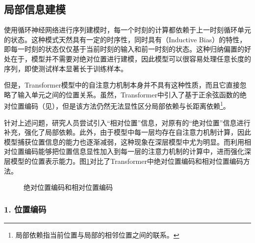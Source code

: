 
\subsection{局部信息建模}\label{subsec-15.1.1}

\parinterval 使用循环神经网络进行序列建模时，每一个时刻的计算都依赖于上一时刻循环单元的状态。这种模式天然具有一定的时序性，同时具有{\small{}}（Inductive Bias）的特性，即每一时刻的状态仅仅基于当前时刻的输入和前一时刻的状态。这种归纳偏置的好处在于，模型并不需要对绝对位置进行建模，因此模型可以很容易处理任意长度的序列，即使测试样本显著长于训练样本。

\parinterval 但是，Transformer模型中的自注意力机制本身并不具有这种性质，而且它直接忽略了输入单元之间的位置关系。虽然，Transformer中引入了基于正余弦函数的绝对位置编码（见{\chaptertwelve}），但是该方法仍然无法显性区分局部依赖与长距离依赖\footnote[1]{局部依赖指当前位置与局部的相邻位置之间的联系。}。

\parinterval 针对上述问题，研究人员尝试引入“相对位置”信息，对原有的“绝对位置”信息进行补充，强化了局部依赖。此外，由于模型中每一层均存在自注意力机制计算，因此模型捕获位置信息的能力也逐渐减弱，这种现象在深层模型中尤为明显。而利用相对位置编码能够把位置信息显性加入到每一层的注意力机制的计算中，进而强化深层模型的位置表示能力。图\ref{fig:15-1}对比了Transformer中绝对位置编码和相对位置编码方法。

\begin{figure}[htp]
\centering

\caption{绝对位置编码和相对位置编码}
\label{fig:15-1}
\end{figure}


\subsubsection{1. 位置编码}\label{subsubsec-15.1.1}

